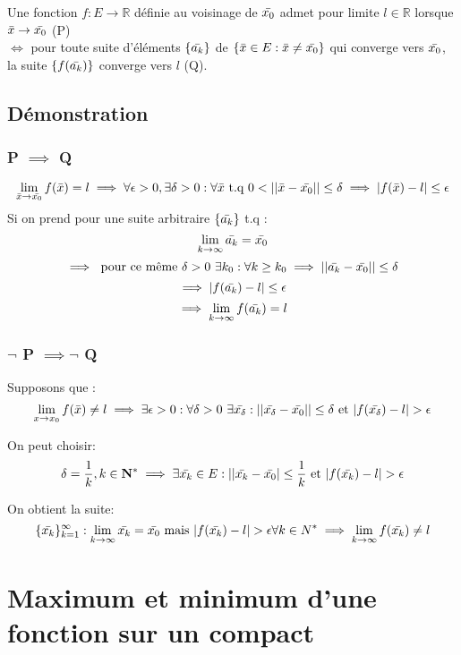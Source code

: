 \documentclass{article}
\begin{document}
Une fonction $ f : E \to \mathbb{R} $ définie au voisinage de $ \Bar{x_0} $ admet pour limite $ l \in \mathbb{R} $ lorsque $ \Bar{x} \to \Bar{x_0} $ (P)\\
$ \Leftrightarrow $ pour toute suite d'éléments $ \{\Bar{a_k}\} $ de $ \{ \Bar{x} \in E : \Bar{x} \neq \Bar{x_0} \} $ qui converge vers $ \Bar{x_0} $, la suite $ \{f(\Bar{a_k})\} $ converge vers $l$ (Q).  

\subsection{Démonstration}

\subsubsection{P $ \implies $ Q}

\[ \lim_{\Bar{x}\to{\Bar{x_0}}} f(\Bar{x}) = l \implies \forall \epsilon > 0, \exists \delta > 0: \forall \Bar{x} \text{ t.q } 0 < ||\Bar{x}-\Bar{x_0}|| \leq \delta \implies |f(\Bar{x})-l| \leq \epsilon \]
Si on prend pour une suite arbitraire $\{\Bar{a_k}\}$ t.q :
\[ \lim_{k\to\infty} \Bar{a_k} = \Bar{x_0} \]
\[ \implies \text{ pour ce même } \delta > 0\ \exists k_0 : \forall k \geq k_0 \implies ||\Bar{a_k} - \Bar{x_0}|| \leq \delta \]
\[ \implies |f(\Bar{a_k}) - l| \leq \epsilon \]
\[ \implies \lim_{k\to\infty} f(\Bar{a_k}) = l \]

\subsubsection{$ \neg $ P $ \implies \neg $ Q}

Supposons que :
\[ \lim_{x\to{x_0}} f(\Bar{x}) \neq l \implies \exists \epsilon > 0 : \forall \delta > 0\ \exists \Bar{x_\delta} : ||\Bar{x_\delta} - \Bar{x_0}|| \leq \delta \text{ et } |f(\Bar{x_\delta}) - l| > \epsilon \]

On peut choisir:
\[ \delta = \frac{1}{k}, k \in \mathbf{N^*} \implies \exists \Bar{x_k} \in E : ||\Bar{x_k} - \Bar{x_0}| \leq \frac{1}{k} \text{ et } |f(\Bar{x_k}) - l| > \epsilon \]

On obtient la suite:
\[ \{\Bar{x_k}\}_{k = 1}^{\infty} : \lim_{k\to\infty} \Bar{x_k} = \Bar{x_0} \text{ mais } |f(\Bar{x_k}) - l| > \epsilon \forall k \in N^* \implies \lim_{k\to\infty} f(\Bar{x_k}) \neq l \]

\newpage

\section{Maximum et minimum d'une fonction sur un compact}
\end{document}
